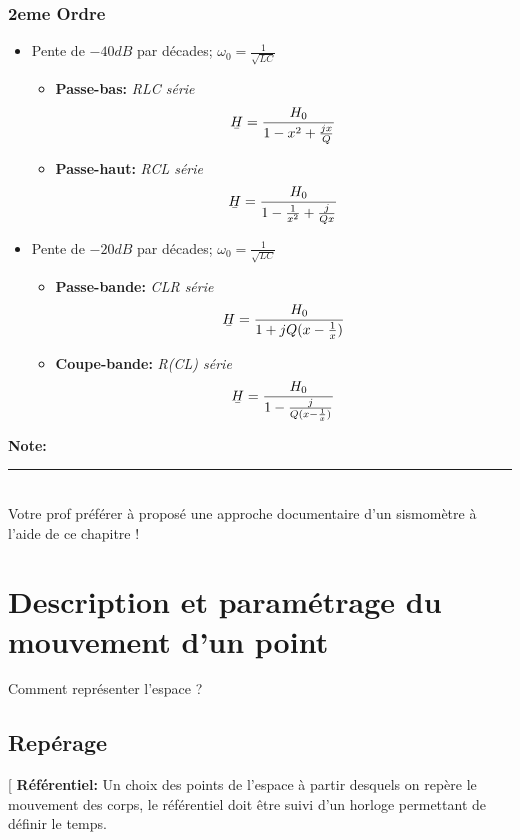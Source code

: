 \documentclass[12pt,hidelinks]{article}
\newcommand{\ubar}[1]{\text{\b{$#1$}}}
\begin{document}
        \subsubsection{2eme Ordre}
            \begin{itemize}
                \item Pente de $-40dB$ par décades; $\omega_0=\frac{1}{\sqrt{LC}}$
                \begin{itemize}
                    \item \textbf{Passe-bas:} \textit{RLC série} 
                    \[\ubar{H} = \frac{H_0}{1-x^2+\frac{jx}{Q}}\]
                    \item \textbf{Passe-haut:} \textit{RCL série} 
                    \[\ubar{H} = \frac{H_0}{1-\frac{1}{x^2}+\frac{j}{Qx}}\]
                \end{itemize}
                \item Pente de $-20dB$ par décades; $\omega_0=\frac{1}{\sqrt{LC}}$
                \begin{itemize}
                    \item \textbf{Passe-bande:} \textit{CLR série} 
                    \[\ubar{H} = \frac{H_0}{1+jQ(x-\frac{1}{x})}\]
                    \item \textbf{Coupe-bande:} \textit{R(CL) série} 
                    \[\ubar{H} = \frac{H_0}{1-\frac{j}{Q(x-\frac{1}{x})}}\]
                \end{itemize}
            \end{itemize}

    \vfill
    \small{\noindent \textbf{Note:} \vspace{-3mm}\\
    \noindent \rule{3.3cm}{0.5pt} \\
        Votre prof préférer à proposé une approche documentaire d'un sismomètre à l'aide de ce chapitre !}
\newpage

\section{Description et paramétrage du mouvement d'un point}
\vspace{3cm}
	Comment représenter l'espace ?
    \subsection{Repérage}
        \begin{DashedDefinition}{}[
            \textbf{Référentiel:} Un choix des points de l'espace à partir desquels on repère le mouvement des corps, le référentiel doit être suivi d'un horloge permettant de définir le temps.
        \end{DashedDefinition}
        
\end{document}

